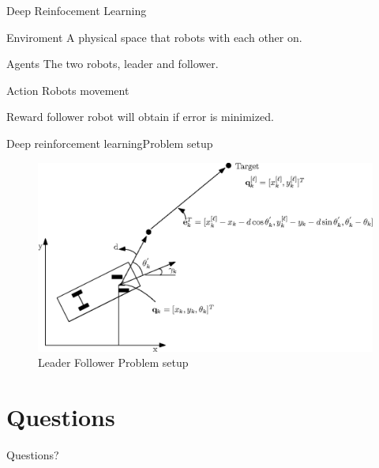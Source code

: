 \documentclass{beamer}
\begin{document}
\begin{frame}{Deep Reinfocement Learning}
\begin{block}{Enviroment}
A physical space that robots with each other on.
\end{block}
\begin{block}{Agents}
The two robots, leader and follower.
\end{block}
\begin{block}{Action}
Robots movement
\end{block}
\begin{block}{Reward}
follower robot will obtain if error is minimized.
\end{block}
\end{frame}

\begin{frame}{Deep reinforcement learning}{Problem setup}
\begin{center}
\begin{figure}
\includegraphics[scale=0.8]{figs/img/LF-Setup.eps}
\caption{Leader Follower Problem setup}
\end{figure}
\end{center}
\end{frame}
\section*{Questions}
\begin{frame}
\begin{LARGE}
\begin{center}
Questions?
\end{center}
\end{LARGE}
\end{frame}

\end{document}
